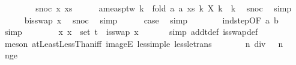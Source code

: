 \begin{isabellebody}
\ \ \isamarkupfalse%
\isanewline
\ \ \ \ \isamarkupfalse%
\ {\isacharparenleft}{\kern0pt}snoc\ x\ xs{\isacharparenright}{\kern0pt}\isanewline
\ \ \ \ \isamarkupfalse%
\ a{\isacharcolon}{\kern0pt}{\isachardoublequoteopen}meas{\isacharunderscore}{\kern0pt}ptw\ {\isacharparenleft}{\kern0pt}{\isasymlambda}k\ {\isasymomega}{\isachardot}{\kern0pt}\ fold\ {\isacharparenleft}{\kern0pt}{\isasymlambda}a{\isachardot}{\kern0pt}\ a{\isacharparenright}{\kern0pt}\ xs\ {\isacharparenleft}{\kern0pt}{\isasymlambda}k{\isachardot}{\kern0pt}\ X\ k\ {\isasymomega}{\isacharparenright}{\kern0pt}\ k{\isacharparenright}{\kern0pt}{\isachardoublequoteclose}\ \isamarkupfalse%
\ snoc\ \isamarkupfalse%
\ simp\isanewline
\ \ \ \ \isamarkupfalse%
\ b{\isacharcolon}{\kern0pt}{\isachardoublequoteopen}is{\isacharunderscore}{\kern0pt}swap\ x{\isachardoublequoteclose}\ \isamarkupfalse%
\ snoc\ \isamarkupfalse%
\ simp\isanewline
\ \ \ \ \isamarkupfalse%
\ {\isacharquery}{\kern0pt}case\ \isamarkupfalse%
\ simp\isanewline
\ \ \ \ \ \ \isamarkupfalse%
\ ind{\isacharunderscore}{\kern0pt}step{\isacharbrackleft}{\kern0pt}OF\ a\ b{\isacharbrackright}{\kern0pt}\ \isamarkupfalse%
\ simp\isanewline
\ \ \isamarkupfalse%
\isanewline
\ \ \isamarkupfalse%
\ \isamarkupfalse%
\ {\isachardoublequoteopen}{\isasymAnd}x{\isachardot}{\kern0pt}\ x\ {\isasymin}\ set\ t\ {\isasymLongrightarrow}\ is{\isacharunderscore}{\kern0pt}swap\ x{\isachardoublequoteclose}\ \isanewline
\ \ \ \ \isamarkupfalse%
\ {\isacharparenleft}{\kern0pt}simp\ add{\isacharcolon}{\kern0pt}t{\isacharunderscore}{\kern0pt}def\ is{\isacharunderscore}{\kern0pt}swap{\isacharunderscore}{\kern0pt}def{\isacharparenright}{\kern0pt}\ \isanewline
\ \ \ \ \isamarkupfalse%
\ {\isacharparenleft}{\kern0pt}meson\ atLeastLessThan{\isacharunderscore}{\kern0pt}iff\ imageE\ less{\isacharunderscore}{\kern0pt}imp{\isacharunderscore}{\kern0pt}le\ less{\isacharunderscore}{\kern0pt}le{\isacharunderscore}{\kern0pt}trans{\isacharparenright}{\kern0pt}\ \ \isanewline
\ \ \isamarkupfalse%
\ \isamarkupfalse%
\ {\isachardoublequoteopen}n\ div\ {}\ {\isacharless}{\kern0pt}\ n{\isachardoublequoteclose}\ \isamarkupfalse%
\ n{\isacharunderscore}{\kern0pt}ge{\isacharunderscore}{\kern0pt}{}\ \isamarkupfalse%

\end{isabellebody}
